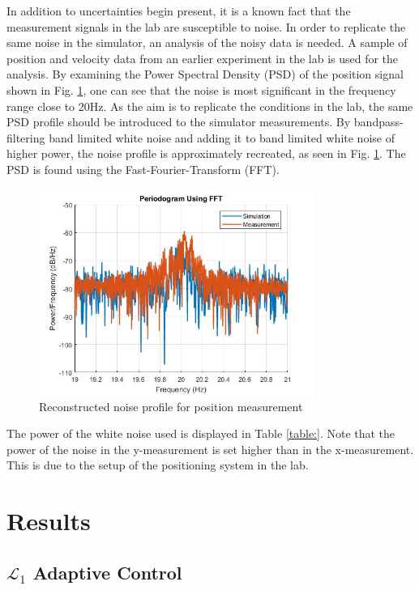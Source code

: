 In addition to uncertainties begin present, it is a known fact that the measurement signals in the lab are susceptible to noise. In order to replicate the same noise in the simulator, an analysis of the noisy data is needed. A sample of position and velocity data from an earlier experiment in the lab is used for the analysis. By examining the Power Spectral Density (PSD) of the position signal shown in Fig. \ref{fig:PSD}, one can see that the noise is most significant in the frequency range close to 20Hz. As the aim is to replicate the conditions in the lab, the same PSD profile should be introduced to the simulator measurements. By bandpass-filtering band limited white noise and adding it to band limited white noise of higher power, the noise profile is approximately recreated, as seen in Fig. \ref{fig:PSD}. The PSD is found using the Fast-Fourier-Transform (FFT). 

\begin{figure}[!h]
\centering
\includegraphics[width=0.8\textwidth]{fig/PSD.jpg}
\caption{Reconstructed noise profile for position measurement}
\label{fig:PSD}
\end{figure}

The power of the white noise used is displayed in Table \ref{table:}. Note that the power of the noise in the y-measurement is set higher than in the x-measurement. This is due to the setup of the positioning system in the lab.


\section{Results}

\subsection{$\mathcal{L}_1$ Adaptive Control}

